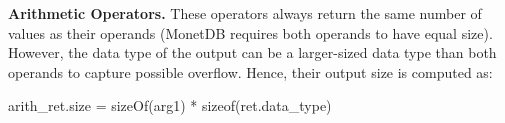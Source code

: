 \documentclass[conference]{IEEEtran}
\def\Skip{\par\medskip\nobreak\noindent}
\begin{document}
\Skip\textbf{Arithmetic Operators.}
%
These operators always return the same number of values as their operands (MonetDB requires both operands to have equal size).
However, the data type of the output can be a larger-sized data type than both operands to capture possible overflow.
Hence, their output size is computed as:
\begin{verb}
arith_ret.size = sizeOf(arg1) * sizeof(ret.data_type)
\end{verb}
\end{document}
